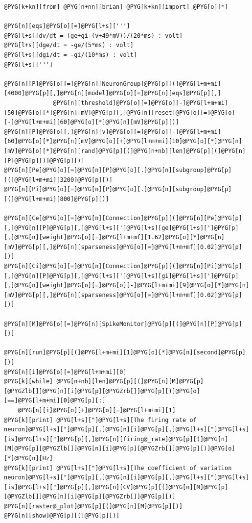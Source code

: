 \documentclass[letterpaper,10pt,english]{manual}
\begin{document}
\begin{Verbatim}[commandchars=@\[\]]
@PYG[k+kn][from] @PYG[n+nn][brian] @PYG[k+kn][import] @PYG[o][*]

@PYG[n][eqs]@PYG[o][=]@PYG[l+s][''']
@PYG[l+s][dv/dt = (ge+gi-(v+49*mV))/(20*ms) : volt]
@PYG[l+s][dge/dt = -ge/(5*ms) : volt]
@PYG[l+s][dgi/dt = -gi/(10*ms) : volt]
@PYG[l+s][''']

@PYG[n][P]@PYG[o][=]@PYG[n][NeuronGroup]@PYG[p][(]@PYG[l+m+mi][4000]@PYG[p][,]@PYG[n][model]@PYG[o][=]@PYG[n][eqs]@PYG[p][,]
              @PYG[n][threshold]@PYG[o][=]@PYG[o][-]@PYG[l+m+mi][50]@PYG[o][*]@PYG[n][mV]@PYG[p][,]@PYG[n][reset]@PYG[o][=]@PYG[o][-]@PYG[l+m+mi][60]@PYG[o][*]@PYG[n][mV]@PYG[p][)]
@PYG[n][P]@PYG[o][.]@PYG[n][v]@PYG[o][=]@PYG[o][-]@PYG[l+m+mi][60]@PYG[o][*]@PYG[n][mV]@PYG[o][+]@PYG[l+m+mi][10]@PYG[o][*]@PYG[n][mV]@PYG[o][*]@PYG[n][rand]@PYG[p][(]@PYG[n+nb][len]@PYG[p][(]@PYG[n][P]@PYG[p][)]@PYG[p][)]
@PYG[n][Pe]@PYG[o][=]@PYG[n][P]@PYG[o][.]@PYG[n][subgroup]@PYG[p][(]@PYG[l+m+mi][3200]@PYG[p][)]
@PYG[n][Pi]@PYG[o][=]@PYG[n][P]@PYG[o][.]@PYG[n][subgroup]@PYG[p][(]@PYG[l+m+mi][800]@PYG[p][)]

@PYG[n][Ce]@PYG[o][=]@PYG[n][Connection]@PYG[p][(]@PYG[n][Pe]@PYG[p][,]@PYG[n][P]@PYG[p][,]@PYG[l+s][']@PYG[l+s][ge]@PYG[l+s][']@PYG[p][,]@PYG[n][weight]@PYG[o][=]@PYG[l+m+mf][1.62]@PYG[o][*]@PYG[n][mV]@PYG[p][,]@PYG[n][sparseness]@PYG[o][=]@PYG[l+m+mf][0.02]@PYG[p][)]
@PYG[n][Ci]@PYG[o][=]@PYG[n][Connection]@PYG[p][(]@PYG[n][Pi]@PYG[p][,]@PYG[n][P]@PYG[p][,]@PYG[l+s][']@PYG[l+s][gi]@PYG[l+s][']@PYG[p][,]@PYG[n][weight]@PYG[o][=]@PYG[o][-]@PYG[l+m+mi][9]@PYG[o][*]@PYG[n][mV]@PYG[p][,]@PYG[n][sparseness]@PYG[o][=]@PYG[l+m+mf][0.02]@PYG[p][)]

@PYG[n][M]@PYG[o][=]@PYG[n][SpikeMonitor]@PYG[p][(]@PYG[n][P]@PYG[p][)]

@PYG[n][run]@PYG[p][(]@PYG[l+m+mi][1]@PYG[o][*]@PYG[n][second]@PYG[p][)]
@PYG[n][i]@PYG[o][=]@PYG[l+m+mi][0]
@PYG[k][while] @PYG[n+nb][len]@PYG[p][(]@PYG[n][M]@PYG[p][@PYGZlb[]]@PYG[n][i]@PYG[p][@PYGZrb[]]@PYG[p][)]@PYG[o][==]@PYG[l+m+mi][0]@PYG[p][:]
    @PYG[n][i]@PYG[o][+]@PYG[o][=]@PYG[l+m+mi][1]
@PYG[k][print] @PYG[l+s]["]@PYG[l+s][The firing rate of neuron]@PYG[l+s]["]@PYG[p][,]@PYG[n][i]@PYG[p][,]@PYG[l+s]["]@PYG[l+s][is]@PYG[l+s]["]@PYG[p][,]@PYG[n][firing@_rate]@PYG[p][(]@PYG[n][M]@PYG[p][@PYGZlb[]]@PYG[n][i]@PYG[p][@PYGZrb[]]@PYG[p][)]@PYG[o][*]@PYG[n][Hz]
@PYG[k][print] @PYG[l+s]["]@PYG[l+s][The coefficient of variation neuron]@PYG[l+s]["]@PYG[p][,]@PYG[n][i]@PYG[p][,]@PYG[l+s]["]@PYG[l+s][is]@PYG[l+s]["]@PYG[p][,]@PYG[n][CV]@PYG[p][(]@PYG[n][M]@PYG[p][@PYGZlb[]]@PYG[n][i]@PYG[p][@PYGZrb[]]@PYG[p][)]
@PYG[n][raster@_plot]@PYG[p][(]@PYG[n][M]@PYG[p][)]
@PYG[n][show]@PYG[p][(]@PYG[p][)]
\end{Verbatim}
\end{document}
